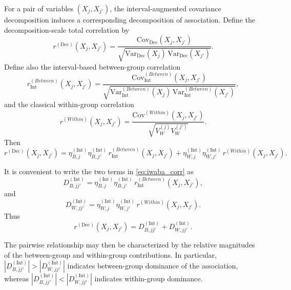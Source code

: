 \documentclass[preprint, times, 12pt, authoryear]{elsarticle}
\begin{document}
For a pair of variables $(X_j,X_{j'})$, the interval-augmented covariance decomposition induces a corresponding decomposition of association. Define the decomposition-scale total correlation by
\begin{equation}\label{eq:iwaba_total_corr}
	r^{(\mathrm{Dec})}(X_j,X_{j'})
	=
	\frac{\mathrm{Cov}_{\mathrm{Dec}}(X_j,X_{j'})}
	{\sqrt{\mathrm{Var}_{\mathrm{Dec}}(X_j)\,\mathrm{Var}_{\mathrm{Dec}}(X_{j'})}}.
\end{equation}
Define also the interval-based between-group correlation
\begin{equation}\label{eq:r_between_int}
	r_{\mathrm{Int}}^{(Between)}(X_j,X_{j'})
	=
	\frac{\mathrm{Cov}_{\mathrm{Int}}^{(Between)}(X_j,X_{j'})}
	{\sqrt{\mathrm{Var}_{\mathrm{Int}}^{(Between)}(X_j)\,\mathrm{Var}_{\mathrm{Int}}^{(Between)}(X_{j'})}},
\end{equation}
and the classical within-group correlation
\begin{equation}\label{eq:r_within_iwaba}
	r^{(Within)}(X_j,X_{j'})
	=
	\frac{\mathrm{Cov}^{(Within)}(X_j,X_{j'})}
	{\sqrt{V_W^{(j)}V_W^{(j')}}}.
\end{equation}
Then
\begin{equation}\label{eq:iwaba_corr}
	r^{(\mathrm{Dec})}(X_j,X_{j'})
	=
	\eta_{B,j}^{(\mathrm{Int})}\eta_{B,j'}^{(\mathrm{Int})}\,r_{\mathrm{Int}}^{(Between)}(X_j,X_{j'})
	+
	\eta_{W,j}^{(\mathrm{Int})}\eta_{W,j'}^{(\mathrm{Int})}\,r^{(Within)}(X_j,X_{j'}).
\end{equation}

It is convenient to write the two terms in \eqref{eq:iwaba_corr} as
\begin{equation}\label{eq:between_weighted_component}
	D_{B,jj'}^{(\mathrm{Int})}
	=
	\eta_{B,j}^{(\mathrm{Int})}\eta_{B,j'}^{(\mathrm{Int})}\,r_{\mathrm{Int}}^{(Between)}(X_j,X_{j'}),
\end{equation}
and
\begin{equation}\label{eq:within_weighted_component}
	D_{W,jj'}^{(\mathrm{Int})}
	=
	\eta_{W,j}^{(\mathrm{Int})}\eta_{W,j'}^{(\mathrm{Int})}\,r^{(Within)}(X_j,X_{j'}).
\end{equation}
Thus
\[
r^{(\mathrm{Dec})}(X_j,X_{j'}) = D_{B,jj'}^{(\mathrm{Int})}+D_{W,jj'}^{(\mathrm{Int})}.
\]

The pairwise relationship may then be characterized by the relative magnitudes of the between-group and within-group contributions. In particular, $|D_{B,jj'}^{(\mathrm{Int})}|>|D_{W,jj'}^{(\mathrm{Int})}|$ indicates between-group dominance of the association, whereas $|D_{B,jj'}^{(\mathrm{Int})}|<|D_{W,jj'}^{(\mathrm{Int})}|$ indicates within-group dominance.
\end{document}
